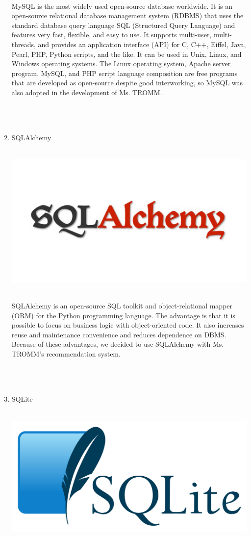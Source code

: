 \documentclass[conference]{IEEEtran}
\begin{document}
\begin{enumerate}
\\ MySQL is the most widely used open-source database worldwide. It is an open-source relational database management system (RDBMS) that uses the standard database query language SQL (Structured Query Language) and features very fast, flexible, and easy to use. It supports multi-user, multi-threads, and provides an application interface (API) for C, C++, Eiffel, Java, Pearl, PHP, Python scripts, and the like. It can be used in Unix, Linux, and Windows operating systems. The Linux operating system, Apache server program, MySQL, and PHP script language composition are free programs that are developed as open-source despite good interworking, so MySQL was also adopted in the development of Ms. TROMM.\\ \\ \\ \\
    \item SQLAlchemy \\ \\
\centerline{\includegraphics[scale=0.1]{sqlalchemy.jpg}}
\\ SQLAlchemy is an open-source SQL toolkit and object-relational mapper (ORM) for the Python programming language. The advantage is that it is possible to focus on business logic with object-oriented code. It also increases reuse and maintenance convenience and reduces dependence on DBMS. Because of these advantages, we decided to use SQLAlchemy with Ms. TROMM's recommendation system.\\ \\ \\ \\
    \item SQLite \\ \\
\centerline{\includegraphics[scale=0.1]{SQLite.png}}

\end{enumerate}
\end{document}
